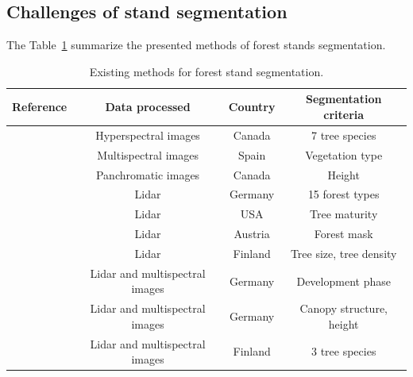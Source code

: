 \subsection{Challenges of stand segmentation}
The Table~\ref{table:methods} summarize the presented methods of forest stands segmentation. 
\begin{table}
\begin{center}
\begin{tabular}{|l|c|c|c|}
\hline
Reference & Data processed & Country & Segmentation criteria \\
\hline
\cite{leckie2003stand} & Hyperspectral images & Canada & 7 tree species \\
\hline
\cite{hernando2012spatial} & Multispectral images & Spain & Vegetation type \\
\hline
\cite{Mora20102474} & Panchromatic images & Canada & Height \\
\hline
\cite{koch2009airborne} & Lidar & Germany & 15 forest types \\
\hline
\cite{sullivan2009object} & Lidar & USA & Tree maturity \\
\hline
\cite{eysn2012forest} & Lidar &  Austria & Forest mask \\
\hline
\cite{wu2014data} & Lidar & Finland & Tree size, tree density \\
\hline
\cite{tiede2004object} & Lidar and multispectral images & Germany & Development phase \\
\hline
\cite{diedershagen2004automatic} & Lidar and multispectral images & Germany & Canopy structure, height \\
\hline
\cite{leppanen2008automatic} & Lidar and multispectral images & Finland & 3 tree species \\
\hline
\end{tabular}
\caption{Existing methods for forest stand segmentation.}
\label{table:methods}
\end{center}
\end{table}

